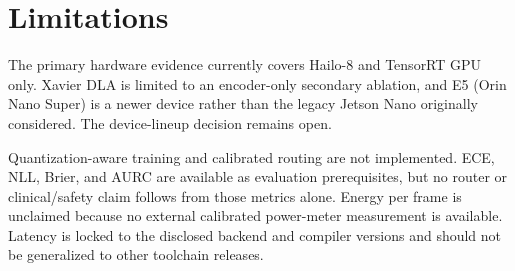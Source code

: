 \section{Limitations}
\label{sec:limitations}

The primary hardware evidence currently covers Hailo-8 and TensorRT GPU only. Xavier DLA is limited to an encoder-only secondary ablation, and E5 (Orin Nano Super) is a newer device rather than the legacy Jetson Nano originally considered. The device-lineup decision remains open.

Quantization-aware training and calibrated routing are not implemented. ECE, NLL, Brier, and AURC are available as evaluation prerequisites, but no router or clinical/safety claim follows from those metrics alone. Energy per frame is unclaimed because no external calibrated power-meter measurement is available. Latency is locked to the disclosed backend and compiler versions and should not be generalized to other toolchain releases.

